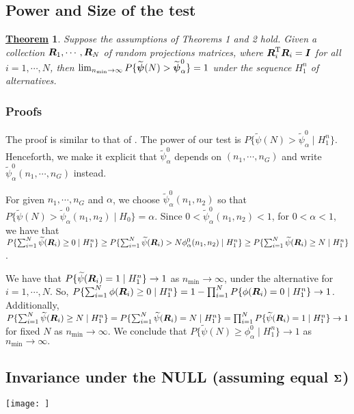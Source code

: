 \documentclass[12pt]{article}
\newtheorem{Th}{\underline{\bf Theorem}}
\def\boldpsi{{\mbox{\boldmath $\psi$}}}
\def\trans{^{\rm T}}
\newcommand{\uI}       {\mbox{\boldmath$I$}}
\newcommand{\uR}       {\mbox{\boldmath$R$}}
\newcommand{\uSigma}            {\mbox{\boldmath$\Sigma$}}
\begin{document}
\subsection{Power and Size of the test}
\begin{Th}
Suppose the assumptions of Theorems 1 and 2 hold.
Given a collection $\uR_1, \cdots, \uR_N$ of random projections matrices,
where $\uR_{i}\trans\uR_{i} = \uI$ for all $i = 1, \cdots, N$, then $\lim_{n_{\min} \rightarrow \infty} P\{\widetilde{\boldpsi}(N) > \widetilde{\boldpsi}^{0}_{\alpha}\}  = 1$ under the sequence $H^{n}_{1}$ of alternatives.
\end{Th}
\subsubsection{Proofs}
The proof is similar to that of \citealp{zoh2018powerful}.
The power of our test is $P\{ \widetilde{\psi}(N) > \widetilde{\psi}^{0}_{\alpha}\mid  H^{n}_{1}\}$.
Henceforth, we make it explicit that $\widetilde{\psi}^{0}_{\alpha}$ depends on $(n_1, \cdots ,n_G)$ and write $\widetilde{\psi}^{0}_{\alpha}(n_1, \cdots, n_G)$ instead.

For given $n_1, \cdots, n_G$ and $\alpha$, we choose $\widetilde{\psi}^{0}_{\alpha}(n_1, n_2)$ so that $P\{\widetilde{\psi}(N) > \widetilde{\psi}^{0}_{\alpha}(n_1, n_2)\mid  H_{0}\}  = \alpha$.
Since $ 0 < \widetilde{\psi}^{0}_{\alpha}(n_1, n_2) < 1$, for $0 < \alpha < 1$, we have that $P\{ \sum^{N}_{i=1}\widetilde{\psi}(\uR_i) \geq             0 \mid H^{n}_{1} \} \geq P\{ \sum^{N}_{i=1}\widetilde{\psi}(\uR_i) > N\phi^{0}_{\alpha}(n_1, n_2) \mid H^{n}_{1} \} \geq P\{ \sum^{N}_{i=1}\widetilde{\psi}(\uR_i) \geq N \mid H^{n}_{1} \}$.

We have that $P\{\widetilde{\psi}(\uR_i) =1 \mid H^{n}_{1}\} \rightarrow 1$ as $n_{\min} \rightarrow \infty$, under the alternative for $i = 1, \cdots, N$. So, $P\{ \sum^{N}_{i=1}\phi(\uR_i) \geq 0 \mid H^{n}_{1} \} = 1 - \prod_{i=1}^{N}P\{\phi(\uR_i) = 0 \mid H^{n}_{1} \} \rightarrow 1$.
Additionally, $P\{ \sum^{N}_{i=1}\widetilde{\psi}(\uR_i) \geq N \mid H^{n}_{1} \} = P\{ \sum^{N}_{i=1}\widetilde{\psi}(\uR_i) = N \mid H^{n}_{1} \} = \prod_{i=1}^{N}P\{\widetilde{\psi}(\uR_i) = 1 \mid H^{n}_{1}\} \rightarrow 1$ for fixed $N$ as $n_{\min} \rightarrow \infty$. We conclude that $P\{ \widetilde{\psi}(N) \geq \phi^{0}_{\alpha}\mid  H^{n}_{1}\} \rightarrow 1$ as $n_{\min} \rightarrow \infty.$

\subsection{Invariance under the NULL (assuming equal $\uSigma$)}

\texttt{[image: ]}
%


\end{document}
